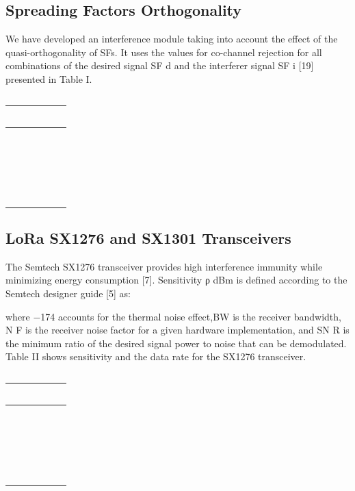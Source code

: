 \subsection{Spreading Factors Orthogonality}
We have developed an interference module taking into account the effect of the quasi-orthogonality of SFs.
It uses the values for co-channel rejection for all combinations of the desired signal SF d and the interferer signal SF i [19] presented in Table I.

\begin{table}[h!]
\scriptsize
	\begin{tabulary}{\textwidth}{L|L|L|L|L}
	\  &  &  &  &  \\\hline
	\  &  &  &  &  \\\hline
	\  &  &  &  &  \\\hline
	\  &  &  &  &  \\\hline
	\  &  &  &  &  \\\hline
	\end{tabulary}
\caption{\label{tab:} }
\end{table}

\subsection{LoRa SX1276 and SX1301 Transceivers}

The Semtech SX1276 transceiver provides high interference immunity while minimizing energy consumption [7].
Sensitivity ρ dBm is defined according to the Semtech designer guide [5] as:

where −174 accounts for the thermal noise effect,BW is the receiver bandwidth,
	N F is the receiver noise factor for a given hardware implementation,
	and SN R is the minimum ratio of the desired signal power to noise that can be demodulated.
Table II shows sensitivity and the data rate for the SX1276 transceiver.


\begin{table}[h!]
\scriptsize
	\begin{tabulary}{\textwidth}{L|L|L|L|L}
	\  &  &  &  &  \\\hline
	\  &  &  &  &  \\\hline
	\  &  &  &  &  \\\hline
	\  &  &  &  &  \\\hline
	\  &  &  &  &  \\\hline
	\end{tabulary}
\caption{\label{tab:} }
\end{table}

